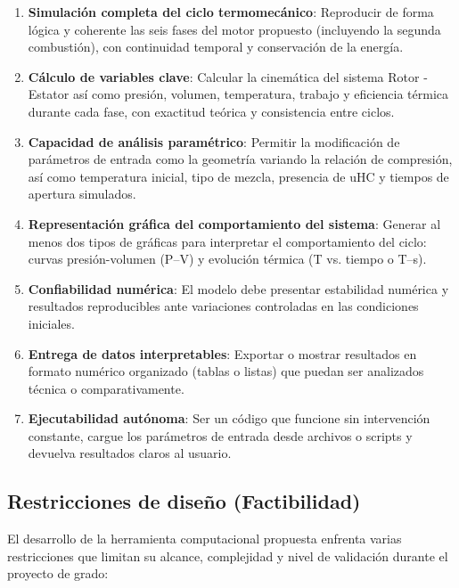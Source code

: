 \documentclass{LS}
\begin{document}
\begin{enumerate}
    \item \textbf{Simulación completa del ciclo termomecánico}: Reproducir de forma lógica y coherente las seis fases del motor propuesto (incluyendo la segunda combustión), con continuidad temporal y conservación de la energía.
    
    \item \textbf{Cálculo de variables clave}: Calcular la cinemática del sistema Rotor - Estator así como presión, volumen, temperatura, trabajo y eficiencia térmica durante cada fase, con exactitud teórica y consistencia entre ciclos.
    
    \item \textbf{Capacidad de análisis paramétrico}: Permitir la modificación de parámetros de entrada como la geometría variando la relación de compresión, así como temperatura inicial, tipo de mezcla, presencia de uHC y tiempos de apertura simulados.
    
    \item \textbf{Representación gráfica del comportamiento del sistema}: Generar al menos dos tipos de gráficas para interpretar el comportamiento del ciclo: curvas presión-volumen (P--V) y evolución térmica (T vs. tiempo o T--s).
    
    \item \textbf{Confiabilidad numérica}: El modelo debe presentar estabilidad numérica y resultados reproducibles ante variaciones controladas en las condiciones iniciales.
    
    \item \textbf{Entrega de datos interpretables}: Exportar o mostrar resultados en formato numérico organizado (tablas o listas) que puedan ser analizados técnica o comparativamente.
    
    \item \textbf{Ejecutabilidad autónoma}: Ser un código que funcione sin intervención constante, cargue los parámetros de entrada desde archivos o scripts y devuelva resultados claros al usuario.
\end{enumerate}

\vspace{1em}
\subsection{Restricciones de diseño (Factibilidad)}

El desarrollo de la herramienta computacional propuesta enfrenta varias restricciones que limitan su alcance, complejidad y nivel de validación durante el proyecto de grado:
\end{document}
